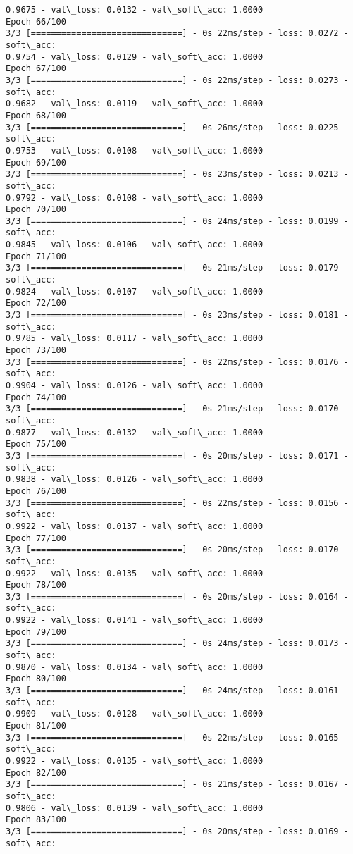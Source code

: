 \documentclass[11pt]{article}
\begin{document}
\begin{Verbatim}[commandchars=\\\{\}]
0.9675 - val\_loss: 0.0132 - val\_soft\_acc: 1.0000
Epoch 66/100
3/3 [==============================] - 0s 22ms/step - loss: 0.0272 - soft\_acc:
0.9754 - val\_loss: 0.0129 - val\_soft\_acc: 1.0000
Epoch 67/100
3/3 [==============================] - 0s 22ms/step - loss: 0.0273 - soft\_acc:
0.9682 - val\_loss: 0.0119 - val\_soft\_acc: 1.0000
Epoch 68/100
3/3 [==============================] - 0s 26ms/step - loss: 0.0225 - soft\_acc:
0.9753 - val\_loss: 0.0108 - val\_soft\_acc: 1.0000
Epoch 69/100
3/3 [==============================] - 0s 23ms/step - loss: 0.0213 - soft\_acc:
0.9792 - val\_loss: 0.0108 - val\_soft\_acc: 1.0000
Epoch 70/100
3/3 [==============================] - 0s 24ms/step - loss: 0.0199 - soft\_acc:
0.9845 - val\_loss: 0.0106 - val\_soft\_acc: 1.0000
Epoch 71/100
3/3 [==============================] - 0s 21ms/step - loss: 0.0179 - soft\_acc:
0.9824 - val\_loss: 0.0107 - val\_soft\_acc: 1.0000
Epoch 72/100
3/3 [==============================] - 0s 23ms/step - loss: 0.0181 - soft\_acc:
0.9785 - val\_loss: 0.0117 - val\_soft\_acc: 1.0000
Epoch 73/100
3/3 [==============================] - 0s 22ms/step - loss: 0.0176 - soft\_acc:
0.9904 - val\_loss: 0.0126 - val\_soft\_acc: 1.0000
Epoch 74/100
3/3 [==============================] - 0s 21ms/step - loss: 0.0170 - soft\_acc:
0.9877 - val\_loss: 0.0132 - val\_soft\_acc: 1.0000
Epoch 75/100
3/3 [==============================] - 0s 20ms/step - loss: 0.0171 - soft\_acc:
0.9838 - val\_loss: 0.0126 - val\_soft\_acc: 1.0000
Epoch 76/100
3/3 [==============================] - 0s 22ms/step - loss: 0.0156 - soft\_acc:
0.9922 - val\_loss: 0.0137 - val\_soft\_acc: 1.0000
Epoch 77/100
3/3 [==============================] - 0s 20ms/step - loss: 0.0170 - soft\_acc:
0.9922 - val\_loss: 0.0135 - val\_soft\_acc: 1.0000
Epoch 78/100
3/3 [==============================] - 0s 20ms/step - loss: 0.0164 - soft\_acc:
0.9922 - val\_loss: 0.0141 - val\_soft\_acc: 1.0000
Epoch 79/100
3/3 [==============================] - 0s 24ms/step - loss: 0.0173 - soft\_acc:
0.9870 - val\_loss: 0.0134 - val\_soft\_acc: 1.0000
Epoch 80/100
3/3 [==============================] - 0s 24ms/step - loss: 0.0161 - soft\_acc:
0.9909 - val\_loss: 0.0128 - val\_soft\_acc: 1.0000
Epoch 81/100
3/3 [==============================] - 0s 22ms/step - loss: 0.0165 - soft\_acc:
0.9922 - val\_loss: 0.0135 - val\_soft\_acc: 1.0000
Epoch 82/100
3/3 [==============================] - 0s 21ms/step - loss: 0.0167 - soft\_acc:
0.9806 - val\_loss: 0.0139 - val\_soft\_acc: 1.0000
Epoch 83/100
3/3 [==============================] - 0s 20ms/step - loss: 0.0169 - soft\_acc:

\end{Verbatim}
\end{document}
